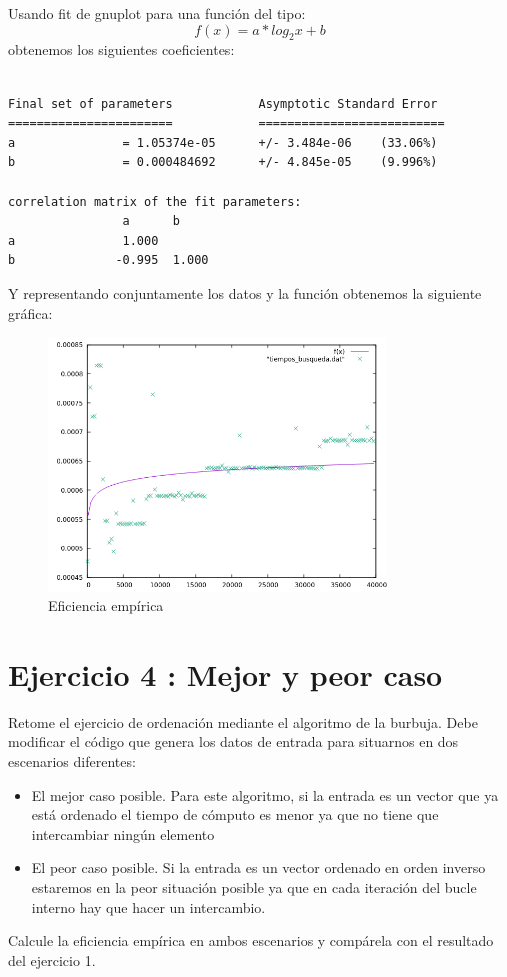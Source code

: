 \documentclass{article}
\begin{document}
        Usando fit de gnuplot para una función del tipo:
        \[
          f(x)=a*log_{2}x+b
        \]
        obtenemos los siguientes coeficientes:
\begin{verbatim}

Final set of parameters            Asymptotic Standard Error
=======================            ==========================
a               = 1.05374e-05      +/- 3.484e-06    (33.06%)
b               = 0.000484692      +/- 4.845e-05    (9.996%)

correlation matrix of the fit parameters:
                a      b      
a               1.000 
b              -0.995  1.000 
\end{verbatim}
        Y representando conjuntamente los datos y la función obtenemos la siguiente gráfica:
        \begin{figure}[H]
  		\caption{Eficiencia empírica}
  		\centering
  		\includegraphics[width=0.8\textwidth]{ejer3/grafica2.png}
	\end{figure}
\clearpage
\section{Ejercicio 4 : Mejor y peor caso}
Retome el ejercicio de ordenación mediante el algoritmo de la burbuja. Debe modificar el
código que genera los datos de entrada para situarnos en dos escenarios diferentes:
\begin{itemize}
	\item El mejor caso posible. Para este algoritmo, si la entrada es un vector que ya está ordenado el tiempo de cómputo es menor ya que no tiene que intercambiar ningún elemento
	\item El peor caso posible. Si la entrada es un vector ordenado en orden inverso estaremos en la peor situación posible ya que en cada iteración del bucle interno hay que hacer un intercambio.
\end{itemize}
	Calcule la eficiencia empírica en ambos escenarios y compárela con el resultado del ejercicio 1.
\clearpage
\end{document}
